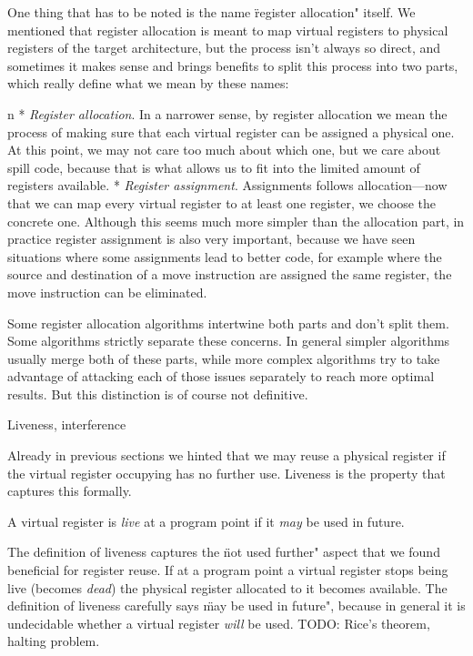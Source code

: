 One thing that has to be noted is the name \"register allocation" itself. We
mentioned that register allocation is meant to map virtual registers to
physical registers of the target architecture, but the process isn't always
so direct, and sometimes it makes sense and brings benefits to split this
process into two parts, which really define what we mean by these names:

\begitems\style n
* {\em Register allocation}. In a narrower sense, by register allocation we mean
the process of making sure that each virtual register can be assigned a physical
one. At this point, we may not care too much about which one, but we care about
spill code, because that is what allows us to fit into the limited amount of
registers available.
* {\em Register assignment}. Assignments follows allocation---now that we
can map every virtual register to at least one register, we choose the
concrete one. Although this seems much more simpler than the allocation part,
in practice register assignment is also very important, because we have seen
situations where some assignments lead to better code, for example where the
source and destination of a move instruction are assigned the same register, the
move instruction can be eliminated.
\enditems

Some register allocation algorithms intertwine both parts and don't split them.
Some algorithms strictly separate these concerns. In general simpler algorithms
usually merge both of these parts, while more complex algorithms try to take
advantage of attacking each of those issues separately to reach more optimal
results. But this distinction is of course not definitive.

\seccc Liveness, interference

Already in previous sections we hinted that we may reuse a physical register if
the virtual register occupying has no further use. Liveness is the property that
captures this formally.

A virtual register is {\em live} at a program point if it {\em may} be used in
future.

The definition of liveness captures the \"not used further" aspect that we found
beneficial for register reuse. If at a program point a virtual register stops
being live (becomes {\em dead}) the physical register allocated to it becomes
available. The definition of liveness carefully says \"may be used in future",
because in general it is undecidable whether a virtual register {\em will} be
used. TODO: Rice's theorem, halting problem.


